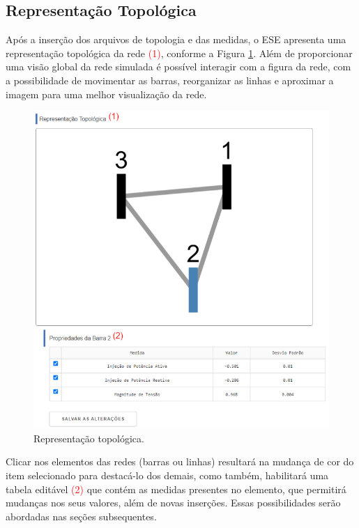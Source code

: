 \documentclass{article}
\begin{document}
\subsection{Representação Topológica}
Após a inserção dos arquivos de topologia e das medidas, o ESE apresenta uma representação topológica da rede \textcolor{red}{(1)}, conforme a Figura \ref{fig::topology}. Além de proporcionar uma visão global da rede simulada é possível interagir com a figura da rede, com a possibilidade de movimentar as barras, reorganizar as linhas e aproximar a imagem para uma melhor visualização da rede.  

\begin{figure}[H]
    \centering
    \includegraphics[scale = .55]{Imagens/Representação_Topologica.png}
    \caption{Representação topológica.}
    \label{fig::topology}
\end{figure}

Clicar nos elementos das redes (barras ou linhas) resultará na mudança de cor do item selecionado para destacá-lo dos demais, como também, habilitará uma tabela editável \textcolor{red}{(2)} que contém as medidas presentes no elemento, que permitirá mudanças nos seus valores, além de novas inserções. Essas possibilidades serão abordadas nas seções subsequentes. 
\end{document}

